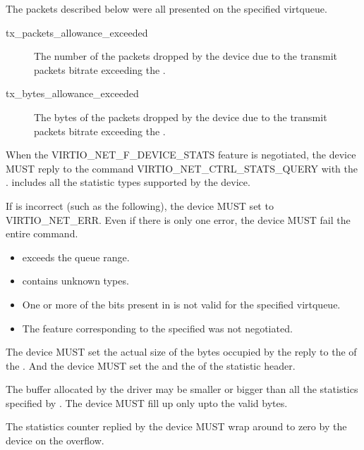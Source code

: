 The packets described below were all presented on the specified virtqueue.
\begin{description}
    \item [tx_packets_allowance_exceeded]
        The number of the packets dropped by the device due to the transmit packets
        bitrate exceeding the .

    \item [tx_bytes_allowance_exceeded]
        The bytes of the packets dropped by the device due to the transmit packets
        bitrate exceeding the .

\end{description}


When the VIRTIO_NET_F_DEVICE_STATS feature is negotiated, the device MUST reply
to the command VIRTIO_NET_CTRL_STATS_QUERY with the
. 
includes all the statistic types supported by the device.

If  is incorrect (such as the
following), the device MUST set  to VIRTIO_NET_ERR. Even if there is
only one error, the device MUST fail the entire command.
\begin{itemize}
    \item {} exceeds the queue range.
    \item {} contains unknown types.
    \item One or more of the bits present in  is not valid
        for the specified virtqueue.
    \item The feature corresponding to the specified  was
        not negotiated.
\end{itemize}

The device MUST set the actual size of the bytes occupied by the reply to the
 of the . And the device MUST set the  and
the  of the statistic header.

The  buffer allocated by the driver may be
smaller or bigger than all the statistics specified by
. The device MUST fill up only upto
the valid bytes.

The statistics counter replied by the device MUST wrap around to zero by the
device on the overflow.

